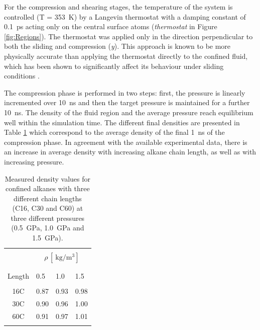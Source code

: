 \documentclass[aps,prb,reprint,superscriptaddress, a4paper]{revtex4-1}
\begin{document}
For the compression and shearing stages, the temperature of the system is controlled (T = \SI{353}{\kelvin}) by a Langevin thermostat \cite{Schneider1978} with a damping constant of \SI{0.1}{\pico\second} acting only on the central surface atoms (\textit{thermostat} in Figure \ref{fig:Regions}). The thermostat was applied only in the direction perpendicular to both the sliding and compression (\emph{y}). This approach is known to be more physically accurate than applying the thermostat directly to the confined fluid, which has been shown to significantly affect its behaviour under sliding conditions \cite{Liem1992,Bernardi2010,Yong2013}.

The compression phase is performed in two steps: first, the pressure is linearly incremented over \SI{10}{\nano\second} and then the target pressure is maintained for a further \SI{10}{\nano\second}. The density of the fluid region and the average pressure reach equilibrium well within the simulation time. The different final densities are presented in Table \ref{tab:rho} which correspond to the average density of the final \SI{1}{\nano\second} of the compression phase. In agreement with the available experimental data\cite{Griesbaum2000}, there is an increase in average density with increasing alkane chain length, as well as with increasing pressure.

\begin{table}
	\caption{Measured density values for confined alkanes  with three different chain lengths (C16, C30 and C60) at three different pressures (\SI{0.5}{\giga\pascal}, \SI{1.0}{\giga\pascal} and \SI{1.5}{\giga\pascal}).}   
	\centering     
	\begin{tabular}{c | l l  l}
		\hline\hline\\ [-2ex]

		
										&	\multicolumn{3}{c}{ $\rho \, [\SI{}{\kilogram\per\cubic\meter}]$} \\

		\hline\\ [-2ex]
		\backslashbox{Chain \\ Length}{P $[\SI{}{\giga\pascal}]$}	&	0.5		&	1.0		&	1.5	\\

		\hline\\ [-2ex]
		16C								&	0.87	&	0.93	&	0.98	\\
		30C								&	0.90	&	0.96	&	1.00	\\	
		60C								&	0.91	&	0.97	&	1.01	\\	

		\hline\hline    \\[-2ex]
	\end{tabular}
	\label{tab:rho}  
\end{table}
\end{document}
